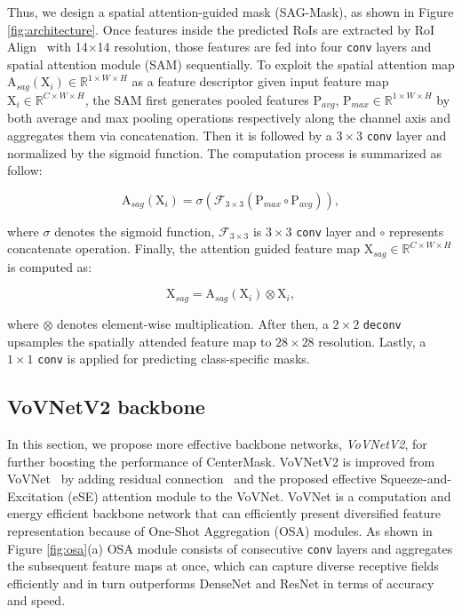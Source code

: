 \documentclass[10pt,twocolumn,letterpaper]{article}
\begin{document}
Thus, we design a spatial attention-guided mask (SAG-Mask), as shown in Figure \ref{fig:architecture}.
Once features inside the predicted RoIs are extracted by RoI Align~\cite{he2017mask} with 14$\times$14 resolution, those features are fed into four \texttt{conv} layers and spatial attention module (SAM) sequentially.
To exploit the spatial attention map $\mathrm{A}_{sag}(\mathrm{X}_i) \in \mathbb{R}^{1 \times W \times H}$ as a feature descriptor given input feature map $\mathrm{X}_i \in \mathbb{R}^{C\times W \times H}$, the SAM first generates pooled features $\mathrm{P}_{avg}$, $\mathrm{P}_{max} \in \mathbb{R}^{1 \times W \times H} $  by both average and max pooling operations respectively along the channel axis and aggregates them via concatenation.
Then it is followed by a $3\times3$ \texttt{conv} layer and normalized by the sigmoid function. The computation process is summarized as follow:

\begin{equation} \label{eq:3}
\mathrm{A}_{sag}(\mathrm{X}_i) = \sigma(\mathcal{F}_{3\times3}(\mathrm{P}_{max} \circ \mathrm{P}_{avg})), 
\end{equation}

\noindent
where $\sigma$ denotes the sigmoid function, $\mathcal{F}_{3\times3}$ is $3\times3$ \texttt{conv} layer and $\circ$ represents concatenate operation.
Finally, the attention guided feature map $\mathrm{X}_{sag} \in \mathbb{R}^{C\times W \times H}$ is computed as:

\begin{equation} \label{eq:4}
\mathrm{X}_{sag} = \mathrm{A}_{sag}(\mathrm{X}_i) \otimes \mathrm{X}_i,
\end{equation}

\noindent
where $\otimes$ denotes element-wise multiplication. After then, a $2\times2$ \texttt{deconv} upsamples the spatially attended feature map to $28\times28$ resolution. Lastly, a $1\times1$ \texttt{conv} is applied for predicting class-specific masks.


\subsection{VoVNetV2 backbone}
In this section, we propose more effective backbone networks, \textit{VoVNetV2}, for further boosting the performance of CenterMask.
VoVNetV2 is improved from VoVNet~\cite{lee2019energy} by adding residual connection~\cite{he2016deep} and the proposed effective Squeeze-and-Excitation (eSE) attention module to the VoVNet.
VoVNet is a computation and energy efficient backbone network that can efficiently present diversified feature representation because of One-Shot Aggregation (OSA) modules. 
As shown in Figure \ref{fig:osa}(a) OSA module consists of consecutive \texttt{conv} layers and aggregates the subsequent feature maps at once, which can capture diverse receptive fields efficiently and in turn outperforms DenseNet and ResNet in terms of accuracy and speed.
\end{document}
